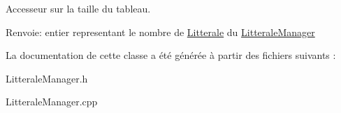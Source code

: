 Accesseur sur la taille du tableau. 

\begin{Desc}
\item[Renvoie:]entier representant le nombre de \hyperlink{class_litterale}{Litterale} du \hyperlink{class_litterale_manager}{LitteraleManager} \end{Desc}


La documentation de cette classe a été générée à partir des fichiers suivants :\begin{CompactItemize}
\item 
LitteraleManager.h\item 
LitteraleManager.cpp\end{CompactItemize}
